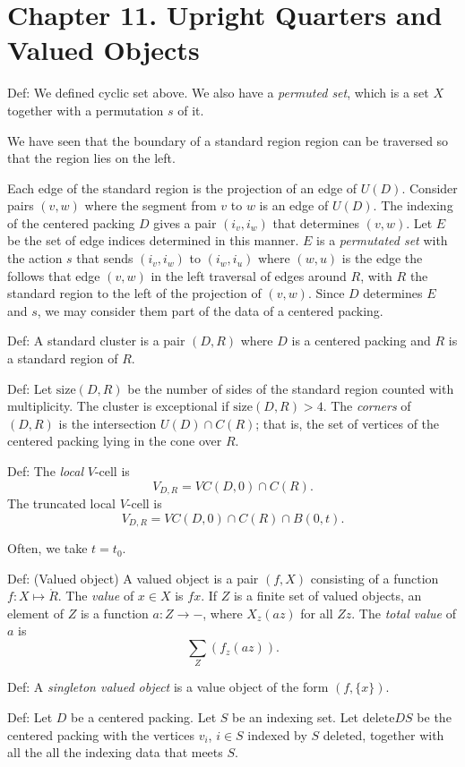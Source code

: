

\chapter{Chapter 11. Upright Quarters and Valued Objects}

Def: We defined cyclic set above.  We also have a {\it permuted set}, which
is a set $X$ together with a permutation $s$ of it.

We have seen that the boundary of a standard region region can be traversed
so that the region lies on the left.

Each edge of the standard region is the projection of an edge of
$U(D)$. Consider pairs $(v,w)$ where the segment from $v$ to $w$
is an edge of $U(D)$.  The indexing of the centered packing $D$
gives a pair $(i_v,i_w)$ that determines $(v,w)$.  Let $E$ be the
set of edge indices determined in this manner.  $E$ is a {\it
permutated set\/} with the action $s$ that sends $(i_v,i_w)$ to
$(i_w,i_u)$ where $(w,u)$ is the edge the follows that edge
$(v,w)$ in the left traversal of edges around $R$, with $R$ the
standard region to the left of the projection of $(v,w)$.  Since
$D$ determines $E$ and $s$, we may consider them part of the data
of a centered packing.

Def:  A standard cluster is a pair $(D,R)$ where $D$ is a centered
packing and $R$ is a standard region of $R$.

Def:  Let $\text{size}(D,R)$ be the number of sides of the
standard region counted with multiplicity.  The cluster is
exceptional if $\text{size}(D,R) > 4$.  The {\it corners} of
$(D,R)$ is the intersection $U(D) \cap C(R)$; that is, the set of
vertices of the centered packing lying in the cone over $R$.

Def: The {\it local } $V$-cell is
$$V_{D,R} = VC(D,0) \cap C(R).$$
The truncated local $V$-cell is
$$V_{D,R} = VC(D,0) \cap C(R) \cap B(0,t).$$

Often, we take $t = t_0$.

Def: (Valued object)  A valued object is a pair $(f,X)$ consisting
of a function $f:X \mapsto \ring{R}$.  The
{\it value\/} of $x\in X$ is $f x$.  If $Z$ is a finite
set of valued objects, an element of $Z$ is a function $a:Z \to -$,
where $X_z(a z)$ for all $Z z$.  The {\it total value} of $a$ is
$$\sum_Z (f_z (a z)).$$

Def: A {\it singleton valued object} is a value object of the form
$(f,\{x\})$.

Def: Let $D$ be a centered packing.  Let $S$ be an indexing set.
Let $\text{delete} D S$ be the centered packing with the vertices
$v_i$, $i \in S$ indexed by $S$ deleted, together with all the all
the indexing data that meets $S$.

